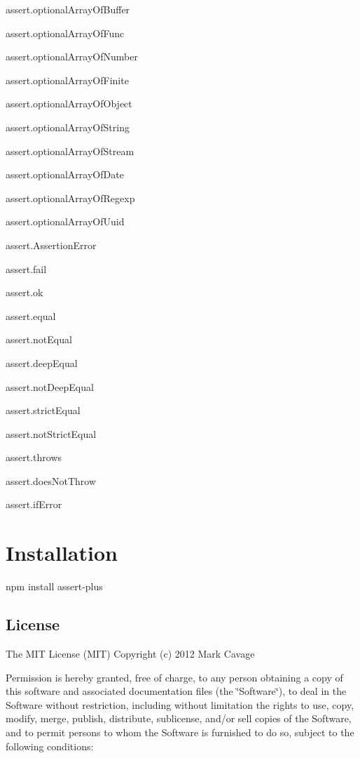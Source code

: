 \begin{DoxyItemize}
\item assert.\+optional\+Array\+Of\+Buffer
\item assert.\+optional\+Array\+Of\+Func
\item assert.\+optional\+Array\+Of\+Number
\item assert.\+optional\+Array\+Of\+Finite
\item assert.\+optional\+Array\+Of\+Object
\item assert.\+optional\+Array\+Of\+String
\item assert.\+optional\+Array\+Of\+Stream
\item assert.\+optional\+Array\+Of\+Date
\item assert.\+optional\+Array\+Of\+Regexp
\item assert.\+optional\+Array\+Of\+Uuid
\item assert.\+Assertion\+Error
\item assert.\+fail
\item assert.\+ok
\item assert.\+equal
\item assert.\+not\+Equal
\item assert.\+deep\+Equal
\item assert.\+not\+Deep\+Equal
\item assert.\+strict\+Equal
\item assert.\+not\+Strict\+Equal
\item assert.\+throws
\item assert.\+does\+Not\+Throw
\item assert.\+if\+Error
\end{DoxyItemize}

\section*{Installation}

\begin{DoxyVerb}npm install assert-plus
\end{DoxyVerb}


\subsection*{License}

The M\+IT License (M\+IT) Copyright (c) 2012 Mark Cavage

Permission is hereby granted, free of charge, to any person obtaining a copy of this software and associated documentation files (the \char`\"{}\+Software\char`\"{}), to deal in the Software without restriction, including without limitation the rights to use, copy, modify, merge, publish, distribute, sublicense, and/or sell copies of the Software, and to permit persons to whom the Software is furnished to do so, subject to the following conditions\+:

